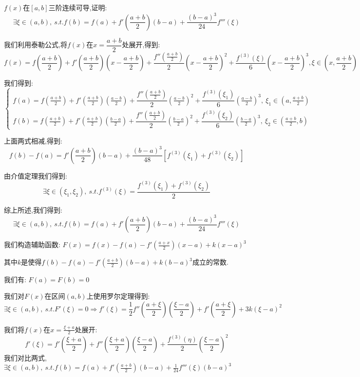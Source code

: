 \begin{proposition}
	$f(x)$在$[a,b]$三阶连续可导,证明: $$\exists \xi\in(a,b),\ s.t. f(b)=f(a)+f'(\dfrac{a+b}{2})(b-a)+\dfrac{(b-a)^3}{24}f'''(\xi)$$
\end{proposition}
\begin{solution}

	我们利用泰勒公式,将$f(x)$在$x=\dfrac{a+b}{2}$处展开,得到:
	$$f(x)=f(\frac{a+b}{2})+f'(\frac{a+b}{2})(x-\frac{a+b}{2})+\dfrac{f''(\frac{a+b}{2})}{2}(x-\frac{a+b}{2})^2+\dfrac{f^{(3)}(\xi)}{6}(x-\frac{a+b}{2})^3,\xi\in(x,\frac{a+b}{2})$$

	我们得到:
	$$\left\lbrace
		\begin{array}{l}
			f(a)=f(\frac{a+b}{2})+f'(\frac{a+b}{2})(\frac{a-b}{2})+\dfrac{f''(\frac{a+b}{2})}{2}(\frac{a-b}{2})^2+\dfrac{f^{(3)}(\xi_{1})}{6}(\frac{a-b}{2})^3,\ \xi_{1}\in (a,\frac{a+b}{2}) \\
			f(b)=f(\frac{a+b}{2})+f'(\frac{a+b}{2})(\frac{b-a}{2})+\dfrac{f''(\frac{a+b}{2})}{2}(\frac{b-a}{2})^2+\dfrac{f^{(3)}(\xi_{2})}{6}(\frac{b-a}{2})^3,\ \xi_{2}\in(\frac{a+b}{2},b)
		\end{array}
		\right. $$

	上面两式相减,得到:
	$$f(b)-f(a)=f'(\frac{a+b}{2})(b-a)+\dfrac{(b-a)^3}{48}[f^{(3)}(\xi_{1})+f^{(3)}(\xi_{2})]$$

	由介值定理我们得到:
	$$\exists\xi\in(\xi_{1},\xi_{2}),\ s.t. f^{(3)}(\xi)=\dfrac{f^{(3)}(\xi_{1})+f^{(3)}(\xi_{2})}{2}$$

	综上所述,我们得到:
	$$\exists \xi\in(a,b),\ s.t. f(b)=f(a)+f'(\dfrac{a+b}{2})(b-a)+\dfrac{(b-a)^3}{24}f'''(\xi)$$
\end{solution}
\begin{anymark}[常数$K$值法]
	我们构造辅助函数: $F(x)=f(x)-f(a)-f'(\frac{a+x}{2})(x-a)+k(x-a)^3$

	其中$k$是使得$f(b)-f(a)-f'(\frac{a+b}{2})(b-a)+k(b-a)^3$成立的常数.

	我们有: $F(a)=F(b)=0$

	我们对$F(x)$在区间$(a,b)$上使用罗尔定理得到:
	$$\exists\xi\in(a,b),\ s.t. F'(\xi)=0\Rightarrow f'(\xi)=\frac{1}{2}f''(\frac{a+\xi}{2})(\frac{\xi-a}{2})+f'(\frac{a+\xi}{2})+3k(\xi-a)^2$$

	我们将$f(x)$在$x=\frac{\xi+a}{2}$处展开:
	$$f'(\xi)=f'(\frac{\xi+a}{2})+f''(\frac{\xi+a}{2})(\frac{\xi-a}{2})+\frac{f^{(3)}(\eta)}{2}(\frac{\xi-a}{2})^2$$
	我们对比两式,$\exists \xi\in(a,b),\ s.t. f(b)=f(a)+f'(\frac{a+b}{2})(b-a)+\frac{1}{24}f'''(\xi)(b-a)^3$
\end{anymark}


